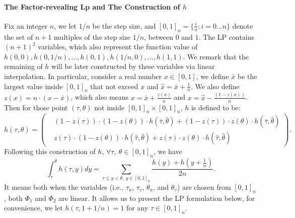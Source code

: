 \paragraph{The Factor-revealing Lp and The Construction of $h$} Fix an integer $n$, we let $1/n$ be the step size, and $[0,1]_n = \{\frac{i}{n}:i = 0 ... n\}$ denote the set of $n+1$ multiples of the step size $1/n$, between $0$ and $1$. The LP contains $(n+1)^2$ variables, which also represent the function value of $h(0,0), h(0,1/n), ..., h(0,1), h(1/n,0), ..., h(1,1)$. We remark that the remaining of $h$ will be later constructed by these variables via linear interpolation. In particular, consider a real number $x\in [0,1]$, we define $\bar{x}$ be the largest value inside $[0,1]_n$ that not exceed $x$ and $\hat{x} = \bar{x} + \frac{1}{n}$. We also define $z(x) = n \cdot (x - \bar{x})$, which also means $x = \bar{x} + \frac{z(x)}{n}$ and $x = \hat{x} - \frac{(1-z(x))}{n}$. Then for those point $(\tau,\theta)$ not inside $[0,1]_n \times [0,1]_n$, $h$ is defined to be:  
$$
h(\tau,\theta) = \left(
    \begin{aligned}
        &(1-z(\tau))\cdot (1-z(\theta)) \cdot h(\bar{\tau},\bar{\theta}) + (1-z(\tau))\cdot z(\theta) \cdot h(\bar{\tau},\hat{\theta}) \\
        &z(\tau)\cdot (1-z(\theta)) \cdot h(\hat{\tau},\bar{\theta}) + z(\tau)\cdot z(\theta) \cdot h(\hat{\tau},\hat{\theta})
    \end{aligned}
\right).
$$
Following this construction of $h$, $\forall \tau,~\theta \in [0,1]_n$, we have 
$$
\int_{\tau}^{\theta} h(\tau,y) dy = \sum_{\tau\leq y < \theta,~ y \in [0,1]_n} \frac{h(y) + h(y+\frac{1}{n})}{2n}.
$$
It means both when the variables (i.e., $\tau_u$, $\tau_v$, $\theta_u$, and $\theta_v$) are chosen from $[0,1]_n$, both $\Phi_1$ and $\Phi_2$ are linear. It allows us to present the LP formulation below, for convenience, we let $h(\tau,1+1/n) = 1$ for any $\tau \in [0,1]_n$. 

